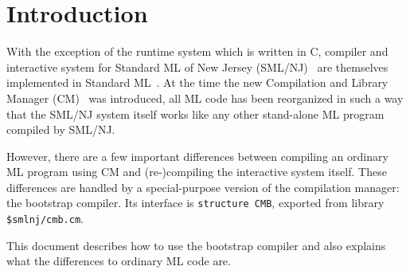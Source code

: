 
\section{Introduction}

With the exception of the runtime system which is written in C,
compiler and interactive system for Standard ML of New Jersey
(SML/NJ)~\cite{appel91:sml} are themselves implemented in Standard
ML~\cite{milner97}.  At the time the new Compilation and Library
Manager (CM)~\cite{blume00:newcm} was introduced, all ML code has been
reorganized in such a way that the SML/NJ system itself works like any
other stand-alone ML program compiled by SML/NJ.

However, there are a few important differences between compiling an
ordinary ML program using CM and (re-)compiling the interactive system
itself.  These differences are handled by a special-purpose version of
the compilation manager: the bootstrap compiler.  Its interface is
{\tt structure CMB}, exported from library {\tt \$smlnj/cmb.cm}.

This document describes how to use the bootstrap compiler and also
explains what the differences to ordinary ML code are.
